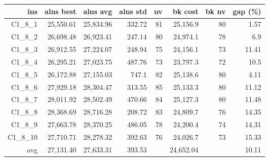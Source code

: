   \begin{table}[caption={Kết quả đo với tập HG\_C\_1\_8 800 yêu cầu}, label=exp:HGC18]
    \centering
    \begin{tabular}{rrrrrrrr}
    \hline
    ins & alns best & alns avg & alns std & nv & bk cost & bk nv & gap (\%) \\ \hline
    C1\_8\_1 & 25,550.61 & 25,834.96 & 332.72 & 81 & 25,156.9 & 80 & 1.57 \\ \hline
    C1\_8\_2 & 26,698.48 & 26,923.41 & 247.14 & 80 & 24,974.1 & 78 & 6.9 \\ \hline
    C1\_8\_3 & 26,912.55 & 27,224.07 & 248.94 & 75 & 24,156.1 & 73 & 11.41 \\ \hline
    C1\_8\_4 & 26,295.21 & 27,023.75 & 487.76 & 73 & 23,797.3 & 72 & 10.5 \\ \hline
    C1\_8\_5 & 26,172.88 & 27,155.03 & 747.1 & 82 & 25,138.6 & 80 & 4.11 \\ \hline
    C1\_8\_6 & 27,929.18 & 28,304.47 & 313.55 & 85 & 25,133.3 & 80 & 11.12 \\ \hline
    C1\_8\_7 & 28,011.92 & 28,502.49 & 470.66 & 84 & 25,127.3 & 80 & 11.48 \\ \hline
    C1\_8\_8 & 28,368.69 & 28,716.28 & 208.72 & 83 & 24,809.7 & 76 & 14.35 \\ \hline
    C1\_8\_9 & 27,663.78 & 28,370.25 & 486.05 & 78 & 24,200.4 & 74 & 14.31 \\ \hline
    C1\_8\_10 & 27,710.71 & 28,278.32 & 392.63 & 76 & 24,026.7 & 73 & 15.33 \\ \hline
    avg & 27,131.40 & 27,633.31 & 393.53 & & 24,652.04 & & 10.11 \\ \hline
    \end{tabular}
  \end{table}


